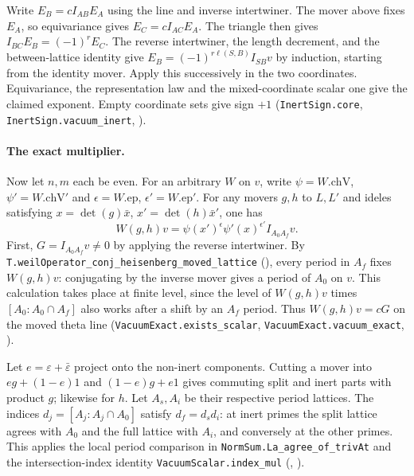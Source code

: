 Write $E_B=c I_{AB}E_A$ using the line and inverse intertwiner.
The mover above fixes $E_A$, so equivariance gives $E_C=c I_{AC}E_A$.
The triangle then gives $I_{BC}E_B=(-1)^r E_C$. The reverse
intertwiner, the length decrement, and the between-lattice identity
give $E_B=(-1)^{r\ell(S,B)}I_{SB}v$ by induction, starting from the
identity mover. Apply this successively in the two coordinates.
Equivariance, the representation law and the mixed-coordinate scalar
one give the claimed exponent. Empty coordinate sets give sign $+1$
(\nolinkurl{InertSign.core}, \nolinkurl{InertSign.vacuum_inert},
).

\paragraph{The exact multiplier.}\label{r15:vacuum-exact}
Now let $n,m$ each be even. For an arbitrary $W$ on $v$, write
$\psi=W.\mathrm{chV}$, $\psi'=W.\mathrm{chV}'$ and
$\epsilon=W.\mathrm{ep}$, $\epsilon'=W.\mathrm{ep}'$. For any
movers $g,h$ to $L,L'$ and ideles satisfying $x=\det(g)\bar x$,
$x'=\det(h)\bar x'$, one has
\[
 W(g,h)v=\psi(x')^{\epsilon}\psi'(x)^{\epsilon'} I_{A_0 A_f}v .
\]
First, $G=I_{A_0 A_f}v\ne0$ by applying the reverse intertwiner.
By \nolinkurl{T.weilOperator_conj_heisenberg_moved_lattice}
(),
every period in $A_f$ fixes
$W(g,h)v$: conjugating by the inverse mover gives a period of $A_0$
on $v$. This calculation takes place at finite level, since the level
of $W(g,h)v$ times $[A_0:A_0\cap A_f]$ also works after a shift by
an $A_f$ period. Thus $W(g,h)v=cG$ on the moved theta line
(\nolinkurl{VacuumExact.exists_scalar}, \nolinkurl{VacuumExact.vacuum_exact},
).

Let $e=\varepsilon+\bar\varepsilon$ project onto the non-inert
components. Cutting a mover into $eg+(1-e)1$ and $(1-e)g+e1$ gives
commuting split and inert parts with product $g$; likewise for $h$.
Let $A_s,A_i$ be their respective period lattices. The indices
$d_j=[A_j:A_j\cap A_0]$ satisfy $d_f=d_s d_i$: at inert primes the
split lattice agrees with $A_0$ and the full lattice with $A_i$,
and conversely at the other primes. This applies the local period
comparison in \nolinkurl{NormSum.La_agree_of_trivAt} and the
intersection-index identity \nolinkurl{VacuumScalar.index_mul}
(,
).


